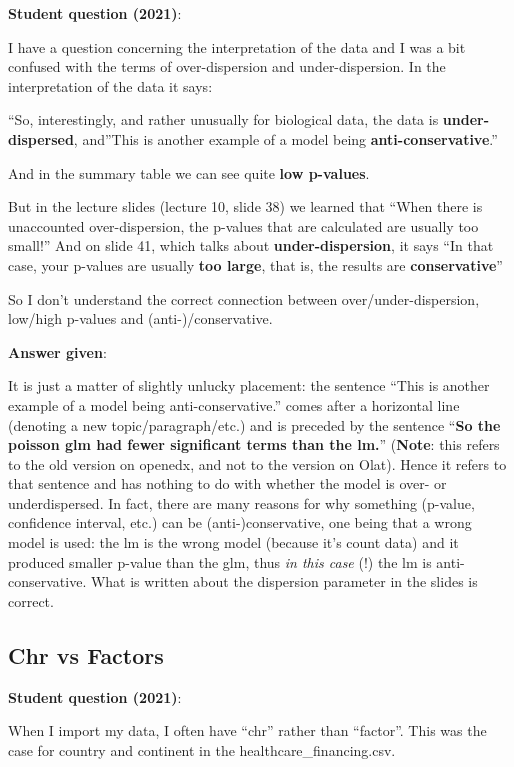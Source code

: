 \documentclass[
  letterpaper,
  8pt,
  a4paper]{book}
\begin{document}
\textbf{Student question (2021)}:

I have a question concerning the interpretation of the data and I was a
bit confused with the terms of over-dispersion and under-dispersion. In
the interpretation of the data it says:

``So, interestingly, and rather unusually for biological data, the data
is \textbf{under-dispersed}, and''This is another example of a model
being \textbf{anti-conservative}.''

And in the summary table we can see quite \textbf{low p-values}.

But in the lecture slides (lecture 10, slide 38) we learned that ``When
there is unaccounted over-dispersion, the p-values that are calculated
are usually too small!'' And on slide 41, which talks about
\textbf{under-dispersion}, it says ``In that case, your p-values are
usually \textbf{too large}, that is, the results are
\textbf{conservative}''

So I don't understand the correct connection between
over/under-dispersion, low/high p-values and (anti-)/conservative.

\textbf{Answer given}:

It is just a matter of slightly unlucky placement: the sentence ``This
is another example of a model being anti-conservative.'' comes after a
horizontal line (denoting a new topic/paragraph/etc.) and is preceded by
the sentence ``\textbf{So the poisson glm had fewer significant terms
than the lm.}'' (\textbf{Note}: this refers to the old version on
openedx, and not to the version on Olat). Hence it refers to that
sentence and has nothing to do with whether the model is over- or
underdispersed. In fact, there are many reasons for why something
(p-value, confidence interval, etc.) can be (anti-)conservative, one
being that a wrong model is used: the lm is the wrong model (because
it's count data) and it produced smaller p-value than the glm, thus
\emph{in this case} (!) the lm is anti-conservative. What is written
about the dispersion parameter in the slides is correct.

\subsection*{Chr vs Factors}\label{chr-vs-factors}

\textbf{Student question (2021)}:

When I import my data, I often have ``chr'' rather than ``factor''. This
was the case for country and continent in the healthcare\_financing.csv.
\end{document}
